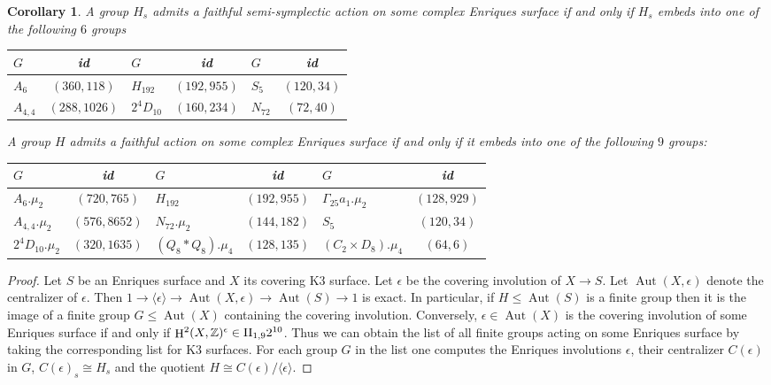 \documentclass[a4paper]{amsart}
\theoremstyle{definition}
\theoremstyle{plain}
\newtheorem{corollary}[definition]{Corollary}
\DeclareMathOperator{\Aut}{Aut}
\DeclareMathOperator{\HH}{H}
\newcommand{\ZZ}{\mathbb{Z}}
\newcommand{\even}{\rm{II}}
\begin{document}
\begin{corollary}
 A group $H_s$ admits a faithful semi-symplectic action on some complex Enriques surface if and only if $H_s$ embeds into one of the following $6$ groups

 \begin{center}
 \renewcommand{\arraystretch}{1.2}
 \begin{tabular}{lc|lc|lc}
 \toprule
 $G$ & id & $G$ & id& $G$ & id\\
 \hline
 $A_6$ & $(360, 118)$ &
 $H_{192}$  & $ (192, 955)$  &
 $S_5$ &  $ (120, 34)$ \\
 $A_{4,4}$ & $ (288, 1026)$ &
 $2^4D_{10}$ &  $ (160, 234)$ &
 $N_{72}$ &  $ (72, 40)$ \\
 \bottomrule
 \end{tabular}
 \end{center}


 A group $H$ admits a faithful action on some complex Enriques surface if and only if it embeds into one of the following $9$ groups:

 \begin{center}
 \renewcommand{\arraystretch}{1.2}
 \begin{tabular}{lc|lc|lc}
 \toprule
 $G$ & id & $G$ & id& $G$ & id\\
 \hline
 $A_6.\mu_2$ & $(720, 765)$ &
 $H_{192}$ &$(192, 955)$ &
 $\Gamma_{25}a_1.\mu_2$ & $(128, 929)$ \\
 $A_{4,4}.\mu_2$ & $(576, 8652)$ &
 $N_{72}.\mu_2$& $(144, 182)$&
 $S_5$& $(120, 34)$ \\
 $2^4D_{10}.\mu_2$ &$(320, 1635)$ &
 $(Q_8 * Q_8).\mu_4$ &$(128, 135)$ &
 $(C_2 \times D_8).\mu_4$ & $(64, 6)$ \\
 \bottomrule
 \end{tabular}
 \end{center}
\end{corollary}
\begin{proof}
 Let $S$ be an Enriques surface and $X$ its covering K3 surface. Let $\epsilon$ be the covering involution of $X \to S$. Let $\Aut(X,\epsilon)$ denote the centralizer of $\epsilon$.
 Then $1 \to \langle \epsilon \rangle \to \Aut(X,\epsilon) \to \Aut(S) \to 1$ is exact.
 In particular, if $H \leq \Aut(S)$ is a finite group then it is the image of a finite group $G \leq \Aut(X)$ containing the covering involution.
 Conversely, $\epsilon \in \Aut(X)$ is the covering involution of some Enriques surface
 if and only if $\HH^2(X,\ZZ)^\epsilon \in \even_{1,9}2^{10}$.
 Thus we can obtain the list of all finite groups acting on some Enriques surface by taking the corresponding list for K3 surfaces. For each group $G$ in the list one computes the Enriques involutions $\epsilon$, their centralizer $C(\epsilon)$ in $G$, $C(\epsilon)_s\cong H_s$ and the quotient $H\cong C(\epsilon)/\langle \epsilon \rangle$.
\end{proof}
\end{document}
